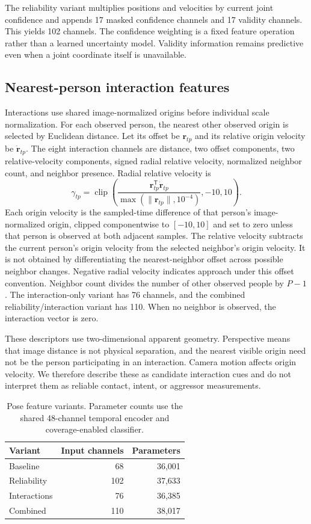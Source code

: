 \documentclass[journal]{IEEEtai}
\begin{document}
The reliability variant multiplies positions and velocities by current joint confidence and appends 17 masked confidence channels and 17 validity channels. This yields 102 channels. The confidence weighting is a fixed feature operation rather than a learned uncertainty model. Validity information remains predictive even when a joint coordinate itself is unavailable.

\subsection{Nearest-person interaction features}
Interactions use shared image-normalized origins before individual scale normalization. For each observed person, the nearest other observed origin is selected by Euclidean distance. Let its offset be $\mathbf{r}_{tp}$ and its relative origin velocity be $\dot{\mathbf{r}}_{tp}$. The eight interaction channels are distance, two offset components, two relative-velocity components, signed radial relative velocity, normalized neighbor count, and neighbor presence. Radial relative velocity is
\begin{equation}
\gamma_{tp}=\operatorname{clip}
\left(\frac{\mathbf{r}_{tp}^{\mathsf T}\dot{\mathbf{r}}_{tp}}
{\max(\|\mathbf{r}_{tp}\|,10^{-4})},-10,10\right).
\end{equation}
Each origin velocity is the sampled-time difference of that person's image-normalized origin, clipped componentwise to $[-10,10]$ and set to zero unless that person is observed at both adjacent samples. The relative velocity subtracts the current person's origin velocity from the selected neighbor's origin velocity. It is not obtained by differentiating the nearest-neighbor offset across possible neighbor changes. Negative radial velocity indicates approach under this offset convention. Neighbor count divides the number of other observed people by $P-1$. The interaction-only variant has 76 channels, and the combined reliability/interaction variant has 110. When no neighbor is observed, the interaction vector is zero.

These descriptors use two-dimensional apparent geometry. Perspective means that image distance is not physical separation, and the nearest visible origin need not be the person participating in an interaction. Camera motion affects origin velocity. We therefore describe these as candidate interaction cues and do not interpret them as reliable contact, intent, or aggressor measurements.

\begin{table}[t]
\caption{Pose feature variants. Parameter counts use the shared 48-channel temporal encoder and coverage-enabled classifier.}
\label{tab:variants}\centering
\begin{tabular}{lrr}
\toprule Variant & Input channels & Parameters\\
\midrule Baseline & 68 & 36,001\\
Reliability & 102 & 37,633\\
Interactions & 76 & 36,385\\
Combined & 110 & 38,017\\
\bottomrule
\end{tabular}
\end{table}
\end{document}
